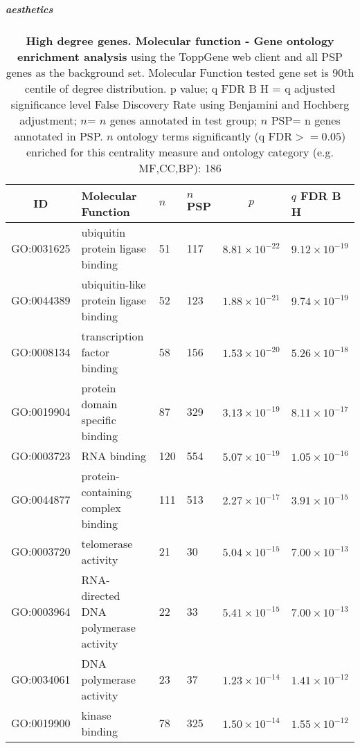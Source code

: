 \subparagraph{aesthetics}
\begin{table}[ht]
\centering
\begin{adjustbox}{width=\textwidth}
\setlength{\extrarowheight}{2pt}

\begin{tabular}{@{}clllcl@{}}
  \toprule
ID & Molecular Function & $n$ & $n$ PSP & $p$ & $q$ FDR B H \\ 
  \midrule
GO:0031625 & ubiquitin protein ligase binding & 51 & 117 & $8.81 \times 10^{-22}$ & $9.12 \times 10^{-19}$ \\ 
  GO:0044389 & ubiquitin-like protein ligase binding & 52 & 123 & $1.88 \times 10^{-21}$ & $9.74 \times 10^{-19}$ \\ 
  GO:0008134 & transcription factor binding & 58 & 156 & $1.53 \times 10^{-20}$ & $5.26 \times 10^{-18}$ \\ 
  GO:0019904 & protein domain specific binding & 87 & 329 & $3.13 \times 10^{-19}$ & $8.11 \times 10^{-17}$ \\ 
  GO:0003723 & RNA binding & 120 & 554 & $5.07 \times 10^{-19}$ & $1.05 \times 10^{-16}$ \\ 
  GO:0044877 & protein-containing complex binding & 111 & 513 & $2.27 \times 10^{-17}$ & $3.91 \times 10^{-15}$ \\ 
  GO:0003720 & telomerase activity & 21 & 30 & $5.04 \times 10^{-15}$ & $7.00 \times 10^{-13}$ \\ 
  GO:0003964 & RNA-directed DNA polymerase activity & 22 & 33 & $5.41 \times 10^{-15}$ & $7.00 \times 10^{-13}$ \\ 
  GO:0034061 & DNA polymerase activity & 23 & 37 & $1.23 \times 10^{-14}$ & $1.41 \times 10^{-12}$ \\ 
  GO:0019900 & kinase binding & 78 & 325 & $1.50 \times 10^{-14}$ & $1.55 \times 10^{-12}$ \\ 
   \bottomrule
\end{tabular}
\end{adjustbox}
\caption[Gene ontology Molecular Function enrichment of genes above 90th centile of degree distribution]{\textbf{High degree genes. Molecular function - Gene ontology enrichment analysis} using the ToppGene web client and all PSP genes as the background set.  Molecular Function tested gene set is 90th centile of degree distribution.  p value; q FDR B H = q adjusted significance level False Discovery Rate using Benjamini and Hochberg adjustment; $n$= $n$ genes annotated in test group; $n$ PSP= n genes annotated in PSP. $n$ ontology terms significantly (q FDR$>=0.05$) enriched for this centrality measure and ontology category (e.g. MF,CC,BP): 186} 
\label{tab:ToppGENE GO: Molecular Function. 90 centile cwpsp.txtp = p value; q FDR B H = q adjusted significance level False Discovery Rate using Benjamini and Hochberg adjustment; n= n genes annotated in test group; n PSP= n genes annotated in PSP. n significant in category 186}
\end{table}
